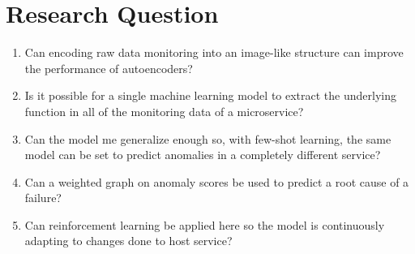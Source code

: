\section{Research Question}


\begin{enumerate}[leftmargin=*,label=\textbf{RQ\arabic*:}]

\item Can encoding raw data monitoring into an image-like structure can improve the performance of autoencoders?

\item Is it possible for a single machine learning model to extract the underlying function in all of the monitoring data of a microservice?

\item  Can the model me generalize enough so, with few-shot learning, the same model can be set to predict anomalies in a completely different service?

\item Can a weighted graph on anomaly scores be used to predict a root cause of a failure?

\item Can reinforcement learning be applied here so the model is continuously adapting to changes done to host service?

\end{enumerate}


